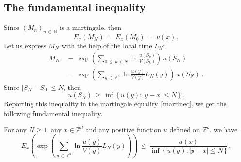 \documentclass[AHL, Unicode, longabstracts, published]{cedram}
\newcommand*\Zd {{\mathbb Z^d}}
\newcommand*\N {{\mathbb N}}
\renewcommand{\N}{\mathbb{N}}
\begin{document}
\subsection{The fundamental inequality}
Since $(M_n)_{n\,\in\,\N}$ is a martingale, then
\begin{equation}\label{martineq}
E_x(M_N)\,=\,E_x(M_0)\,=\,u(x)\,.
\end{equation}
Let us express $M_N$ with the help of the local time $L_N$:
\begin{align*}
M_N\, &=\,\exp\left(\sum_{0\,\leq\,k<N}\ln
\frac{u(S_k)}{V(S_k)}\right)\,u(S_N)\\ &=\,\exp\left(\sum_{y\,\in\,\Zd}\ln
\frac{u(y)}{V(y)}L_N(y)\right)\,u(S_N)
\,.
\end{align*}
Since $|S_N-S_0|\leq N$, then
\[
u(S_N)\,\geq\, \inf\,\{\,u(y):|y-x|\leq N\,\} \,.
\]
Reporting this inequality in the martingale equality~\eqref{martineq}, we get the following fundamental inequality.
\begin{lemm}\label{funine}
For any $N\geq 1$, any $x\in\Zd$ and any positive function $u$ defined on $\Zd$, we have
\[
E_x\left(\exp\left(\sum_{y\,\in\,\Zd}\ln
\frac{u(y)}{V(y)}L_N(y)\right)\right)\,\leq\,
\frac{u(x)}
{\inf\,\{\,u(y):|y-x|\leq N\,\}}\,.
\]
\end{lemm}
\end{document}
